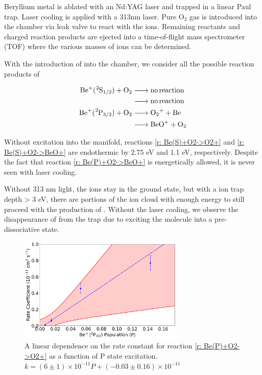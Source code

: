 Beryllium metal is ablated with an Nd:YAG laser and trapped in a linear Paul trap. Laser cooling is applied with a 313nm laser. Pure O$_2$ gas is introduced into the chamber via leak valve to react with the ions. Remaining reactants and charged reaction products are ejected into a time-of-flight mass spectrometer (TOF) where the various masses of ions can be determined.


With the introduction of  into the chamber, we consider all the possible reaction products of 

\begin{align}
	\ce{Be+(^2S1/2) + O2 & -> no reaction} \label{r: Be(S)+O2->O2+} \\
	\ce{& -> no reaction} \label{r: Be(S)+O2->BeO+} \\
	\ce{Be+(^2P3/2) + O2 & -> O2+ + Be} \label{r: Be(P)+O2->O2+} \\
	\ce{& -> BeO+ + O2} \label{r: Be(P)+O2->BeO+}
\end{align}

Without excitation into the  manifold, reactions \ref{r: Be(S)+O2->O2+} and \ref{r: Be(S)+O2->BeO+} are endothermic by 2.75 eV and 1.1 eV, respectively. Despite the fact that reaction \ref{r: Be(P)+O2->BeO+} is energetically allowed, it is never seen with laser cooling.

Without 313 nm light, the  ions stay in the  ground state, but with a ion trap depth > 3 eV, there are portions of the ion cloud with enough energy to still proceed with the production of . Without the laser cooling, we observe the disappearance of  from the trap due to exciting the molecule into a pre-dissociative state.

\begin{figure}[H]
	\centering
	\includegraphics[width=0.7\textwidth]{images/Be_O2_P_state.png}
	\caption{\label{fig: p-state} A linear dependence on the rate constant for reaction \ref{r: Be(P)+O2->O2+} as a function of P state excitation. $k = (6 \pm 1) \times 10^{-11} P + (-0.03 \pm 0.16) \times 10^{-11}$}
\end{figure}

